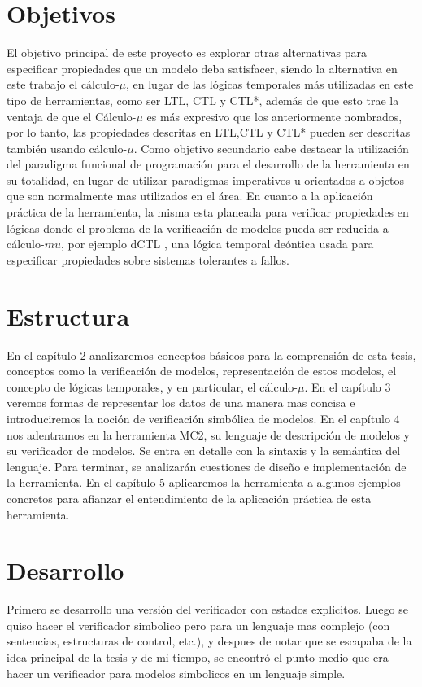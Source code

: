 \section{Objetivos}
El objetivo principal de este proyecto es explorar otras alternativas para especificar propiedades que un modelo deba satisfacer, siendo la alternativa en este trabajo el cálculo-$\mu$, en lugar de las lógicas temporales más utilizadas en este tipo de herramientas, como ser LTL, CTL y CTL*, además de que esto trae la ventaja de que el Cálculo-$\mu$ es más expresivo que los anteriormente nombrados, por lo tanto, las propiedades descritas en LTL,CTL y CTL* pueden ser descritas también usando cálculo-$\mu$.
Como objetivo secundario cabe destacar la utilización del paradigma funcional de programación para el desarrollo de la herramienta en su totalidad, en lugar de utilizar paradigmas imperativos u orientados a objetos que son normalmente mas utilizados en el área. En cuanto a la aplicación práctica de la herramienta, la misma esta planeada para verificar propiedades en lógicas donde el problema de la verificación de modelos pueda ser reducida a cálculo-$mu$, por ejemplo dCTL \cite{Castro:9}, una lógica temporal deóntica usada para especificar propiedades sobre sistemas tolerantes a fallos.

\section{Estructura}
En el capítulo 2 analizaremos conceptos básicos para la comprensión de esta tesis, conceptos como la verificación de modelos, representación de estos modelos, el concepto de lógicas temporales, y en particular, el cálculo-$\mu$.
En el capítulo 3 veremos formas de representar los datos de una manera mas concisa e introduciremos la noción de verificación simbólica de modelos.
En el capítulo 4 nos adentramos en la herramienta MC2, su lenguaje de descripción de modelos y su verificador de modelos. Se entra en detalle con la sintaxis y la semántica del lenguaje. Para terminar, se analizarán cuestiones de diseño e implementación de la herramienta. 
En el capítulo 5 aplicaremos la herramienta a algunos ejemplos concretos para afianzar el entendimiento de la aplicación práctica de esta herramienta.

\section{Desarrollo}
Primero se desarrollo una versión del verificador con estados explicitos. Luego se quiso hacer el verificador simbolico pero para un lenguaje mas complejo (con sentencias, estructuras de control, etc.), y despues de notar que se escapaba de la idea principal de la tesis y de mi tiempo, se encontró el punto medio que era hacer un verificador para modelos simbolicos en un lenguaje simple.


